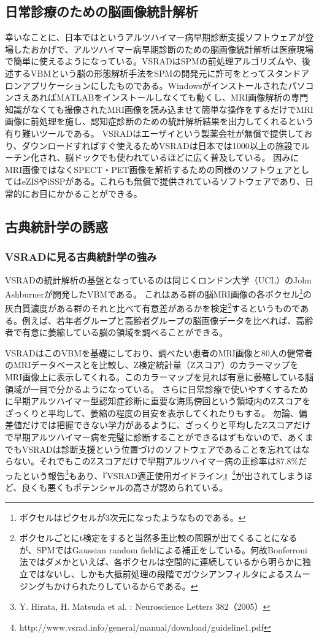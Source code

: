 \subsection{日常診療のための脳画像統計解析}
幸いなことに、日本ではというアルツハイマー病早期診断支援ソフトウェアが登場したおかげで、アルツハイマー病早期診断のための脳画像統計解析は医療現場で簡単に使えるようになっている。VSRADはSPMの前処理アルゴリズムや、後述するVBMという脳の形態解析手法をSPMの開発元に許可をとってスタンドアロンアプリケーションにしたものである。WindowsがインストールされたパソコンさえあればMATLABをインストールしなくても動くし、MRI画像解析の専門知識がなくても撮像されたMRI画像を読み込ませて簡単な操作をするだけでMRI画像に前処理を施し、認知症診断のための統計解析結果を出力してくれるという有り難いツールである。
VSRADはエーザイという製薬会社が無償で提供しており、ダウンロードすればすぐ使えるためVSRADは日本では1000以上の施設でルーチン化され、脳ドックでも使われているほどに広く普及している。
因みにMRI画像ではなくSPECT・PET画像を解析するための同様のソフトウェアとしてはeZISやiSSPがある。これらも無償で提供されているソフトウェアであり、日常的にお目にかかることができる。

\subsection{古典統計学の誘惑}
\subsubsection{VSRADに見る古典統計学の強み}
VSRADの統計解析の基盤となっているのは同じくロンドン大学（UCL）のJohn Ashburnerが開発したVBMである。
これはある群の脳MRI画像の各ボクセル\footnote{ボクセルはピクセルが3次元になったようなものである。}の灰白質濃度がある群のそれと比べて有意差があるかを検定\footnote{ボクセルごとにt検定をすると当然多重比較の問題が出てくることになるが、SPMではGaussian random fieldによる補正をしている。何故Bonferroni法ではダメかといえば、各ボクセルは空間的に連続しているから明らかに独立ではないし、しかも大抵前処理の段階でガウシアンフィルタによるスムージングもかけられたりしているからである。}するというものである。例えば、若年者グループと高齢者グループの脳画像データを比べれば、高齢者で有意に萎縮している脳の領域を調べることができる。

VSRADはこのVBMを基礎にしており、調べたい患者のMRI画像と80人の健常者のMRIデータベースとを比較し、Z検定統計量（Zスコア）のカラーマップをMRI画像上に表示してくれる。このカラーマップを見れば有意に萎縮している脳領域が一目で分かるようになっている。
さらに日常診療で使いやすくするために早期アルツハイマー型認知症診断に重要な海馬傍回という領域内のZスコアをざっくりと平均して、萎縮の程度の目安を表示してくれたりもする。
勿論、偏差値だけでは把握できない学力があるように、ざっくりと平均したZスコアだけで早期アルツハイマー病を完璧に診断することができるはずもないので、あくまでもVSRADは診断支援という位置づけのソフトウェアであることを忘れてはならない。それでもこのZスコアだけで早期アルツハイマー病の正診率は87.8\%だったという報告\footnote{Y. Hirata, H. Matsuda et al. : Neuroscience Letters 382（2005）}もあり、『VSRAD適正使用ガイドライン』\footnote{http://www.vsrad.info/general/manual/download/guideline1.pdf}が出されてしまうほど、良くも悪くもポテンシャルの高さが認められている。

